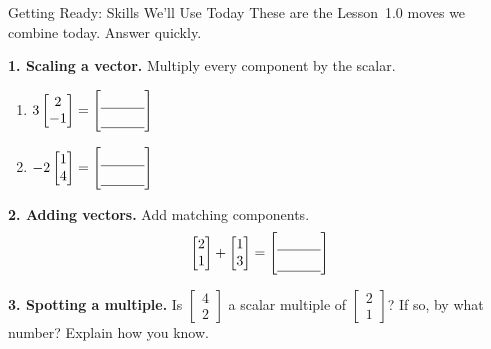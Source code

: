 \documentclass[10pt]{article}
\begin{document}

\vspace{0.12in}

\begin{notesbox}{Getting Ready: Skills We'll Use Today}
\small These are the Lesson~1.0 moves we combine today. Answer quickly.

\vspace{4pt}
\textbf{1. Scaling a vector.} Multiply every component by the scalar.
\begin{enumerate}[label=(\alph*), leftmargin=2.0em, itemsep=8pt]
  \item $3\begin{bmatrix} 2 \\ -1 \end{bmatrix} =
        \begin{bmatrix}\rule{0pt}{1.1em}\blank{1.1cm}\\[2pt]\blank{1.1cm}\end{bmatrix}$
  \item $-2\begin{bmatrix} 1 \\ 4 \end{bmatrix} =
        \begin{bmatrix}\rule{0pt}{1.1em}\blank{1.1cm}\\[2pt]\blank{1.1cm}\end{bmatrix}$
\end{enumerate}

\vspace{8pt}
\textbf{2. Adding vectors.} Add matching components.
\[
  \begin{bmatrix} 2 \\ 1 \end{bmatrix} + \begin{bmatrix} 1 \\ 3 \end{bmatrix} =
  \begin{bmatrix}\rule{0pt}{1.1em}\blank{1.1cm}\\[3pt]\blank{1.1cm}\end{bmatrix}
\]

\vspace{6pt}
\textbf{3. Spotting a multiple.} Is $\begin{bmatrix} 4 \\ 2 \end{bmatrix}$ a scalar multiple of
$\begin{bmatrix} 2 \\ 1 \end{bmatrix}$? If so, by what number? Explain how you know.
\end{notesbox}
\end{document}
